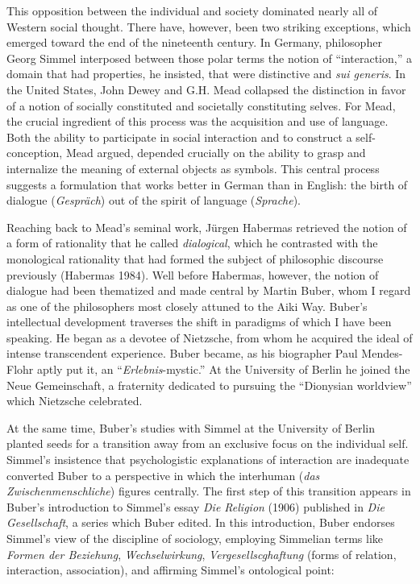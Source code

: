 This opposition between the individual and society dominated nearly all of Western social thought.  There have, however, been two striking exceptions, which emerged toward the end of the nineteenth century. In Germany, philosopher Georg Simmel interposed between those polar terms the notion of ``interaction,'' a domain that had properties, he insisted, that were distinctive and \emph{sui generis}. In the United States, John Dewey and G.H. Mead collapsed the distinction in favor of a notion of socially constituted and societally constituting selves. For Mead, the crucial ingredient of this process was the acquisition and use of language. Both the ability to participate in social interaction and to construct a self-conception, Mead argued, depended crucially on the ability to grasp and internalize the meaning of external objects as symbols. This central process suggests a formulation that works better in German than in English: the birth of dialogue (\emph{Gespr\"{a}ch}) out of the spirit of language (\emph{Sprache}). 

Reaching back to Mead's seminal work, J\"{u}rgen Habermas retrieved the notion of a form of rationality that he called \emph{dialogical}, which he contrasted with the monological rationality that had formed the subject of philosophic discourse previously (Habermas 1984). Well before Habermas, however, the notion of dialogue had been thematized and made central by Martin Buber, whom I regard as one of the philosophers most closely attuned to the Aiki Way. Buber's intellectual development traverses the shift in paradigms of which I have been speaking. He began as a devotee of Nietzsche, from whom he acquired the ideal of intense transcendent experience. Buber became, as his biographer Paul Mendes-Flohr aptly put it, an ``\emph{Erlebnis}-mystic.'' At the University of Berlin he joined the Neue Gemeinschaft, a fraternity dedicated to pursuing the ``Dionysian worldview'' which Nietzsche celebrated. 

At the same time, Buber's studies with Simmel at the University of Berlin planted seeds for a transition away from an exclusive focus on the individual self. Simmel's insistence that psychologistic explanations of interaction are inadequate converted Buber to a perspective in which the interhuman (\emph{das Zwischenmenschliche}) figures centrally. The first step of this transition appears in Buber's introduction to Simmel's essay \emph{Die Religion} (1906) published in \emph{Die Gesellschaft}, a series which Buber edited. In this introduction, Buber endorses Simmel's view of the discipline of sociology, employing Simmelian terms like \emph{Formen der Beziehung}, \emph{Wechselwirkung}, \emph{Vergesellscghaftung} (forms of relation, interaction, association), and affirming Simmel's ontological point:

